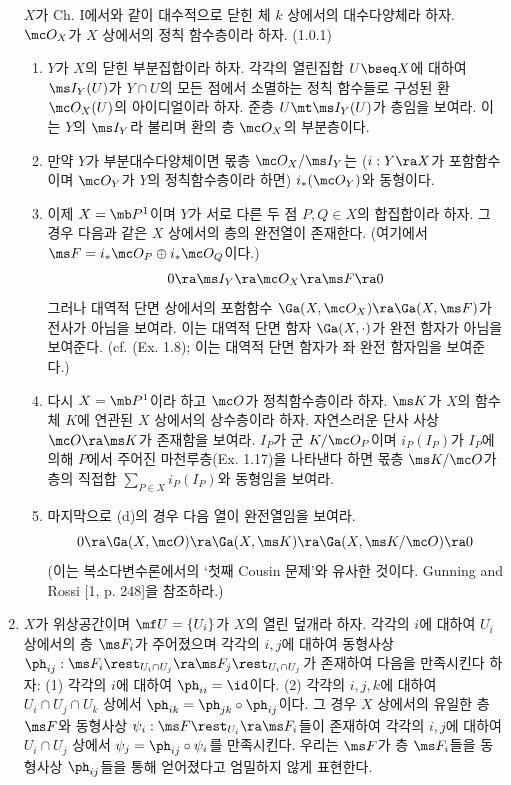 \begin{enumerate}[label=\tb{1.\arabic*.},itemindent=0mm,itemsep=2mm]
	$X$가 Ch. I에서와 같이 대수적으로 닫힌 체 $k$ 상에서의 대수다양체라 하자.
	$\mc O_X$가 $X$ 상에서의 정칙 함수층이라 하자. (1.0.1)
	\begin{enumerate}[label=(\alph*)]
	\item $Y$가 $X$의 닫힌 부분집합이라 하자. 각각의 열린집합 $U\bseq X$에 대하여 $\ms I_Y(U)$가 $Y\cap U$의 모든 점에서 소멸하는
	정칙 함수들로 구성된 환 $\mc O_X(U)$의 아이디얼이라 하자. 준층 $U\mt\ms I_Y(U)$가 층임을 보여라.
	이는 $Y$의  $\ms I_Y$라 불리며 환의 층 $\mc O_X$의 부분층이다.
	\item 만약 $Y$가 부분대수다양체이면 몫층 $\mc O_X/\ms I_Y$는
	($i:Y\ra X$가 포함함수이며 $\mc O_Y$가 $Y$의 정칙함수층이라 하면) $i_*(\mc O_Y)$와 동형이다.
	\item 이제 $X=\mb P^1$이며 $Y$가 서로 다른 두 점 $P,Q\in X$의 합집합이라 하자.
	그 경우 다음과 같은 $X$ 상에서의 층의 완전열이 존재한다. (여기에서 $\ms F=i_*\mc O_P\oplus i_*\mc O_Q$이다.)
	$$0\ra\ms I_Y\ra\mc O_X\ra\ms F\ra 0$$
	그러나 대역적 단면 상에서의 포함함수 $\Ga(X,\mc O_X)\ra\Ga(X,\ms F)$가 전사가 아님을 보여라.
	이는 대역적 단면 함자 $\Ga(X,\cdot)$가 완전 함자가 아님을 보여준다.
	(cf. (Ex. 1.8); 이는 대역적 단면 함자가 좌 완전 함자임을 보여준다.)
	\item 다시 $X=\mb P^1$이라 하고 $\mc O$가 정칙함수층이라 하자. $\ms K$가 $X$의 함수체 $K$에 연관된 $X$ 상에서의 상수층이라 하자.
	자연스러운 단사 사상 $\mc O\ra\ms K$가 존재함을 보여라. $I_P$가 군 $K/\mc O_P$이며 $i_P(I_P)$가 $I_P$에 의해 $P$에서 주어진
	마천루층(Ex. 1.17)을 나타낸다 하면 몫층 $\ms K/\mc O$가 층의 직접합 $\sum_{P\in X}i_P(I_P)$와 동형임을 보여라.
	\item 마지막으로 (d)의 경우 다음 열이 완전열임을 보여라.
	$$0\ra\Ga(X,\mc O)\ra\Ga(X,\ms K)\ra\Ga(X,\ms K/\mc O)\ra 0$$
	(이는 복소다변수론에서의 `첫째 Cousin 문제'와 유사한 것이다. Gunning and Rossi [1, p. 248]을 참조하라.)
	\end{enumerate}
	\item {} $X$가 위상공간이며 $\mf U=\{U_i\}$가 $X$의 열린 덮개라 하자.
	각각의 $i$에 대하여 $U_i$ 상에서의 층 $\ms F_i$가 주어졌으며 각각의 $i,j$에 대하여
	동형사상 $\ph_{ij}:\ms F_i\rest_{U_i\cap U_j}\ra\ms F_j\rest_{U_i\cap U_j}$가 존재하여 다음을 만족시킨다 하자:
	(1) 각각의 $i$에 대하여 $\ph_{ii}=\id$이다.
	(2) 각각의 $i,j,k$에 대하여 $U_i\cap U_j\cap U_k$ 상에서 $\ph_{ik}=\ph_{jk}\circ\ph_{ij}$이다.
	그 경우 $X$ 상에서의 유일한 층 $\ms F$와 동형사상 $\psi_i:\ms F\rest_{U_i}\ra\ms F_i$들이 존재하여
	각각의 $i,j$에 대하여 $U_i\cap U_j$ 상에서 $\psi_j=\ph_{ij}\circ\psi_i$를 만족시킨다.
	우리는 $\ms F$가 층 $\ms F_i$들을 동형사상 $\ph_{ij}$들을 통해  얻어졌다고 엄밀하지 않게 표현한다.
	\end{enumerate}
	

